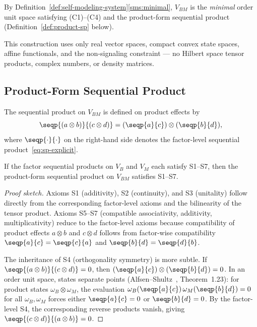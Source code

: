\noindent
By Definition~\ref{def:self-modeling-system}\ref{sms:minimal},
$V_{BM}$ is the \emph{minimal} order unit space satisfying
(C1)--(C4) and the product-form sequential product
(Definition~\ref{def:product-sp} below).%
\label{ass:minimal-composite}

This construction uses only real vector spaces, compact convex state
spaces, affine functionals, and the non-signaling constraint --- no
Hilbert space tensor products, complex numbers, or density matrices.

\subsection{Product-Form Sequential Product}\label{subsec:product-sp}

\begin{definition}\label{def:product-sp}
The sequential product on $V_{BM}$ is defined on product effects by
\begin{equation}\label{eq:product-sp}
  \seqp{(a \otimes b)}{(c \otimes d)}
  = (\seqp{a}{c}) \otimes (\seqp{b}{d}),
\end{equation}
where $\seqp{\cdot}{\cdot}$ on the right-hand side denotes the
factor-level sequential product~\eqref{eq:sp-explicit}.
\end{definition}

\begin{proposition}[S1--S7 inheritance]\label{prop:inheritance}
If the factor sequential products on $V_B$ and $V_M$ each satisfy
S1--S7, then the product-form sequential product on $V_{BM}$ satisfies
S1--S7.
\end{proposition}

\begin{proof}[Proof sketch]
Axioms S1 (additivity), S2 (continuity), and S3 (unitality) follow
directly from the corresponding factor-level axioms and the bilinearity
of the tensor product. Axioms S5--S7 (compatible associativity,
additivity, multiplicativity) reduce to the factor-level axioms because
compatibility of product effects
$a\otimes b$ and $c\otimes d$ follows from factor-wise compatibility
$\seqp{a}{c}=\seqp{c}{a}$ and $\seqp{b}{d}=\seqp{d}{b}$.

The inheritance of S4 (orthogonality symmetry) is more subtle. If
$\seqp{(a\otimes b)}{(c\otimes d)} = 0$, then
$(\seqp{a}{c})\otimes(\seqp{b}{d}) = 0$. In an order unit space, states
separate points (Alfsen--Shultz~\cite{AlfsenShultz2003}, Theorem~1.23):
for product states $\omega_B\otimes\omega_M$, the evaluation
$\omega_B(\seqp{a}{c})\,\omega_M(\seqp{b}{d}) = 0$ for all
$\omega_B,\omega_M$ forces either $\seqp{a}{c} = 0$ or $\seqp{b}{d} = 0$.
By the factor-level S4, the corresponding reverse products vanish, giving
$\seqp{(c\otimes d)}{(a\otimes b)} = 0$.
\end{proof}

